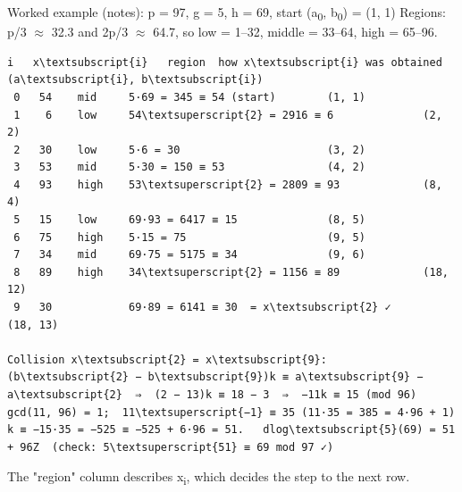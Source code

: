 \documentclass[11pt,a4paper]{article}
\begin{document}
\begin{example}{Worked example (notes): p = 97, g = 5, h = 69, start (a\textsubscript{0}, b\textsubscript{0}) = (1, 1)}
Regions: p/3 \ensuremath{\approx} 32.3 and 2p/3 \ensuremath{\approx} 64.7, so low = 1–32, middle = 33–64, high = 65–96.\par
\begin{workbox}
\begin{Verbatim}[commandchars=\\\{\},fontsize=\scriptsize]
 i   x\textsubscript{i}   region  how x\textsubscript{i} was obtained          (a\textsubscript{i}, b\textsubscript{i})
 0   54    mid     5·69 = 345 ≡ 54 (start)        (1, 1)
 1    6    low     54\textsuperscript{2} = 2916 ≡ 6              (2, 2)
 2   30    low     5·6 = 30                       (3, 2)
 3   53    mid     5·30 = 150 ≡ 53                (4, 2)
 4   93    high    53\textsuperscript{2} = 2809 ≡ 93             (8, 4)
 5   15    low     69·93 = 6417 ≡ 15              (8, 5)
 6   75    high    5·15 = 75                      (9, 5)
 7   34    mid     69·75 = 5175 ≡ 34              (9, 6)
 8   89    high    34\textsuperscript{2} = 1156 ≡ 89             (18, 12)
 9   30            69·89 = 6141 ≡ 30  = x\textsubscript{2} ✓        (18, 13)

Collision x\textsubscript{2} = x\textsubscript{9}:  (b\textsubscript{2} − b\textsubscript{9})k ≡ a\textsubscript{9} − a\textsubscript{2}  ⇒  (2 − 13)k ≡ 18 − 3  ⇒  −11k ≡ 15 (mod 96)
gcd(11, 96) = 1;  11\textsuperscript{−1} ≡ 35 (11·35 = 385 = 4·96 + 1)
k ≡ −15·35 = −525 ≡ −525 + 6·96 = 51.   dlog\textsubscript{5}(69) = 51 + 96Z  (check: 5\textsuperscript{51} ≡ 69 mod 97 ✓)
\end{Verbatim}
\end{workbox}
{\small\color{black!70} The "region" column describes x\textsubscript{i}, which decides the step to the next row.}\par
\end{example}
\end{document}
